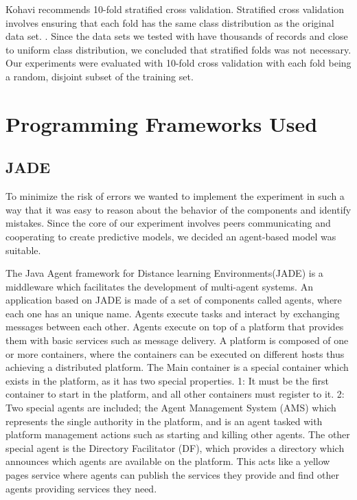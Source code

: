 Kohavi recommends 10-fold stratified cross validation. Stratified cross validation involves ensuring that each fold has the same class distribution as the original data set. . Since the data sets we tested with have thousands of records and close to uniform class distribution, we concluded that stratified folds was not necessary. Our experiments were evaluated with 10-fold cross validation with each fold being a random, disjoint subset of the training set.


\section{Programming Frameworks Used}

 \subsection{JADE}
 
To minimize the risk of errors we wanted to implement the experiment in such a way that it was easy to reason about the behavior of the components and identify mistakes. Since the core of our experiment involves peers communicating and cooperating to create predictive models, we decided an agent-based model was suitable.  
 
The Java Agent framework for Distance learning Environments(JADE) is a middleware which facilitates the development of multi-agent systems. An application based on JADE is made of a set of components called agents, where each one has an unique name. Agents execute tasks and interact by exchanging messages between each other. Agents execute on top of a platform that provides them with basic services such as message delivery. A platform is composed of one or more containers, where the containers can be executed on different hosts thus achieving a distributed platform. The Main container is a special container which exists in the platform, as it has two special properties. 1: It must be the first container to start in the platform, and all other containers must register to it. 2: Two special agents are included; the Agent Management System (AMS) which represents the single authority in the platform, and is an agent tasked with platform management actions such as starting and killing other agents. The other special agent is the Directory Facilitator (DF), which provides a directory which announces which agents are available on the platform. This acts like a yellow pages service where agents can publish the services they provide and find other agents providing services they need.

